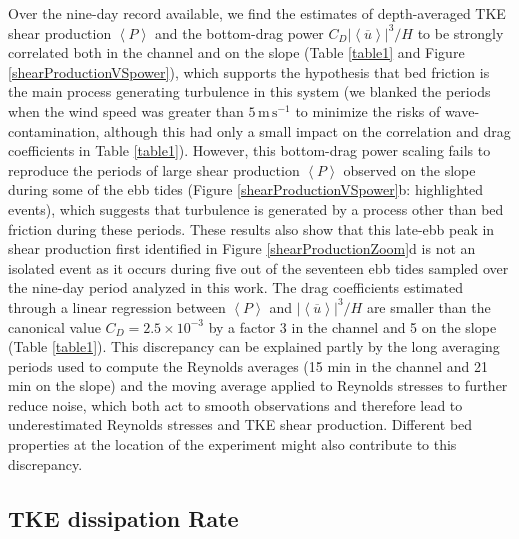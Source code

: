 Over the nine-day record available, we find the estimates of depth-averaged TKE shear production $\left\langle P\right\rangle$ and the bottom-drag power $C_D \left| \left\langle \overline{u} \right\rangle \right|^{3}/H$ to be strongly correlated both in the channel and on the slope (Table \ref{table1} and Figure \ref{shearProductionVSpower}), which supports the hypothesis that bed friction is the main process generating turbulence in this system (we blanked the periods when the wind speed was greater than $5\, \mathrm{m \, s^{-1}}$ to minimize the risks of wave-contamination, although this had only a small impact on the correlation and drag coefficients in Table \ref{table1}). However, this bottom-drag power scaling fails to reproduce the periods of large shear production $\left\langle P\right\rangle$ observed on the slope during some of the ebb tides (Figure \ref{shearProductionVSpower}b: highlighted events), which suggests that turbulence is generated by a process other than bed friction during these periods. These results also show that this late-ebb peak in shear production first identified in Figure \ref{shearProductionZoom}d is not an isolated event as it occurs during five out of the seventeen ebb tides sampled over the nine-day period analyzed in this work. The drag coefficients estimated through a linear regression between $\left\langle P\right\rangle$ and  $\left| \left\langle \overline{u} \right\rangle \right|^{3}/H$ are smaller than the canonical value $C_D=2.5\times 10^{-3}$ by a factor 3 in the channel and 5 on the slope (Table \ref{table1}). This discrepancy can be explained partly by the long averaging periods used to compute the Reynolds averages (15 min in the channel and 21 min on the slope) and the moving average applied to Reynolds stresses to further reduce noise, which both act to smooth observations and therefore lead to underestimated Reynolds stresses and TKE shear production. Different bed properties at the location of the experiment might also contribute to this discrepancy.


\subsection{TKE dissipation Rate}

